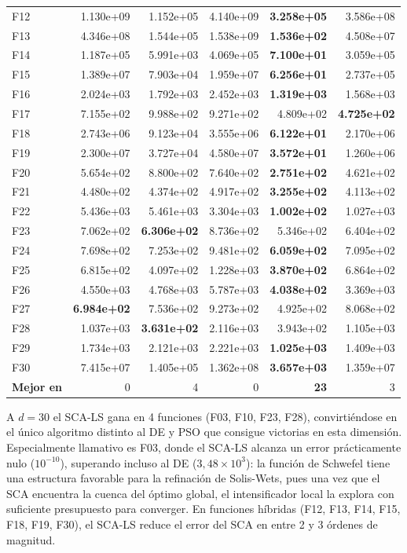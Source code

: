 \documentclass[12pt,a4paper]{article}
\begin{document}
\begin{longtable}{lrrrrr}
F12  & 1.130e+09 & 1.152e+05 & 4.140e+09 & \textbf{3.258e+05} & 3.586e+08 \\
F13  & 4.346e+08 & 1.544e+05 & 1.538e+09 & \textbf{1.536e+02} & 4.508e+07 \\
F14  & 1.187e+05 & 5.991e+03 & 4.069e+05 & \textbf{7.100e+01} & 3.059e+05 \\
F15  & 1.389e+07 & 7.903e+04 & 1.959e+07 & \textbf{6.256e+01} & 2.737e+05 \\
F16  & 2.024e+03 & 1.792e+03 & 2.452e+03 & \textbf{1.319e+03} & 1.568e+03 \\
F17  & 7.155e+02 & 9.988e+02 & 9.271e+02 & 4.809e+02 & \textbf{4.725e+02} \\
F18  & 2.743e+06 & 9.123e+04 & 3.555e+06 & \textbf{6.122e+01} & 2.170e+06 \\
F19  & 2.300e+07 & 3.727e+04 & 4.580e+07 & \textbf{3.572e+01} & 1.260e+06 \\
F20  & 5.654e+02 & 8.800e+02 & 7.640e+02 & \textbf{2.751e+02} & 4.621e+02 \\
F21  & 4.480e+02 & 4.374e+02 & 4.917e+02 & \textbf{3.255e+02} & 4.113e+02 \\
F22  & 5.436e+03 & 5.461e+03 & 3.304e+03 & \textbf{1.002e+02} & 1.027e+03 \\
F23  & 7.062e+02 & \textbf{6.306e+02} & 8.736e+02 & 5.346e+02 & 6.404e+02 \\
F24  & 7.698e+02 & 7.253e+02 & 9.481e+02 & \textbf{6.059e+02} & 7.095e+02 \\
F25  & 6.815e+02 & 4.097e+02 & 1.228e+03 & \textbf{3.870e+02} & 6.864e+02 \\
F26  & 4.550e+03 & 4.768e+03 & 5.787e+03 & \textbf{4.038e+02} & 3.369e+03 \\
F27  & \textbf{6.984e+02} & 7.536e+02 & 9.273e+02 & 4.925e+02 & 8.068e+02 \\
F28  & 1.037e+03 & \textbf{3.631e+02} & 2.116e+03 & 3.943e+02 & 1.105e+03 \\
F29  & 1.734e+03 & 2.121e+03 & 2.221e+03 & \textbf{1.025e+03} & 1.409e+03 \\
F30  & 7.415e+07 & 1.405e+05 & 1.362e+08 & \textbf{3.657e+03} & 1.359e+07 \\
\midrule
\textbf{Mejor en} & 0 & 4 & 0 & \textbf{23} & 3 \\
\end{longtable}
 
A $d=30$ el SCA-LS gana en {4 funciones} (F03, F10, F23, F28), convirtiéndose en el único algoritmo distinto al DE y PSO que consigue victorias en esta dimensión. Especialmente llamativo es F03, donde el SCA-LS alcanza un error prácticamente nulo ($10^{-10}$), superando incluso al DE ($3{,}48 \times 10^3$): la función de Schwefel tiene una estructura favorable para la refinación de Solis-Wets, pues una vez que el SCA encuentra la cuenca del óptimo global, el intensificador local la explora con suficiente presupuesto para converger. En funciones híbridas (F12, F13, F14, F15, F18, F19, F30), el SCA-LS reduce el error del SCA en entre 2 y 3 órdenes de magnitud.
 
\end{document}
